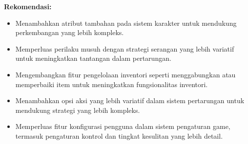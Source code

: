 \documentclass[12pt]{article}
\begin{document}
\textbf{Rekomendasi:} 
\begin{itemize}
    \item Menambahkan atribut tambahan pada sistem karakter untuk mendukung perkembangan yang lebih kompleks.
    \item Memperluas perilaku musuh dengan strategi serangan yang lebih variatif untuk meningkatkan tantangan dalam pertarungan.
    \item Mengembangkan fitur pengelolaan inventori seperti menggabungkan atau memperbaiki item untuk meningkatkan fungsionalitas inventori.
    \item Menambahkan opsi aksi yang lebih variatif dalam sistem pertarungan untuk mendukung strategi yang lebih kompleks.
    \item Memperluas fitur konfigurasi pengguna dalam sistem pengaturan game, termasuk pengaturan kontrol dan tingkat kesulitan yang lebih detail.
\end{itemize}
\end{document}
